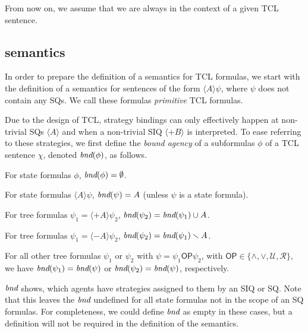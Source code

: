 

From now on, we assume that we are always in the context of a
given TCL sentence. %
\subsection{semantics}
In order to prepare the definition of a semantics for TCL formulas, 
we start with the definition of a semantics for sentences 
of the form $\langle A \rangle \psi$, where $\psi$ does not contain any SQs.
We call these formulas \emph{primitive} TCL formulas.

Due to the design of TCL, strategy bindings can only effectively happen at non-trivial SQs $\langle A \rangle$ and 
when a non-trivial SIQ $\langle +B\rangle$ is interpreted.
%
To ease referring to these strategies, we first define the \emph{bound agency} of a subformulas $\phi$ of a TCL sentence $\chi$, denoted $\textit{bnd}(\phi)$, as follows.
\begin{list1} 
\item For state formulas $\phi$, $\textit{bnd}(\phi)= \emptyset$.  
\item For state formulas $\langle A \rangle \psi$,  $\textit{bnd}(\psi)= A$ (unless $\psi$ is a state formula).
\item For tree formulas $\psi_1=\langle +A \rangle \psi_2$,  $\textit{bnd}(\psi_2) = \textit{bnd}(\psi_1) \cup A$.
\item For tree formulas $\psi_1=\langle -A \rangle \psi_2$,  $\textit{bnd}(\psi_2) = \textit{bnd}(\psi_1) \smallsetminus A$.
\item For all other tree formulas $\psi_1$ or $\psi_2$ with $\psi = \psi_1 \mathsf{OP} \psi_2$, with $\mathsf{OP} \in \{\wedge,\vee,\mathcal U, \mathcal R\}$, we have $\textit{bnd}(\psi_1) = \textit{bnd}(\psi)$ or $\textit{bnd}(\psi_2) = \textit{bnd}(\psi)$, respectively.
\end{list1} 
$\textit{bnd}$ shows, which agents have strategies assigned to them 
by an SIQ or SQ.
Note that this leaves the $\textit{bnd}$ undefined for all state formulas not in the scope of an SQ formulas.
For completeness, we could define $\textit{bnd}$ as empty in these cases, but a definition will not be required in the definition of the semantics.

